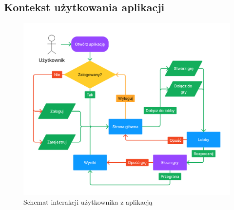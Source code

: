 \chapter{\ChapterTitleScope}
\label{sec:zakres-funkcjonalnosci}


\section{Kontekst użytkowania aplikacji}

\begin{figure}[b!]
  \centering
  \includegraphics[width=\textwidth]{img/flow-aplikacji/user_flow.png}
  \caption{Schemat interakcji użytkownika z aplikacją}
  \label{fig:figma_userflow}
\end{figure}

